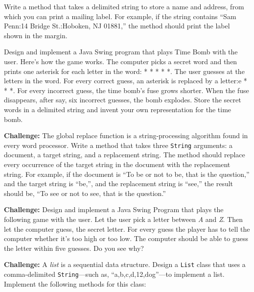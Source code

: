 \begin{EXRtwo}
\item  Write a method that takes a delimited string to
store a name and address, from which you can print a mailing label.  For example, if
the string contains ``Sam Penn:14 Bridge St.:Hoboken, NJ 01881,''
the method should print the label shown in the margin.

\item  Design and implement a Java Swing program that plays Time Bomb with the user.
Here's how the game works.  The computer picks a secret word and then
prints one asterisk for each letter in the word: * * * * *.  The user
guesses at the letters in the word.   For every correct guess, an
asterisk is replaced by a letter:\break * e * * *.  For every incorrect
guess, the time bomb's fuse grows shorter.  When the fuse disappears,
after say, six incorrect guesses, the bomb explodes.  Store the secret
words in a delimited string and invent your own representation for
the time bomb.

\item {\bf Challenge: } The global replace function is a
string-processing algorithm found in every word processor.  Write a
method that takes three {\tt String} arguments: a document, a target
string, and a replacement string.  The method should replace every
occurrence of the target string in the document with the replacement
string.  For example, if the document is ``To be or not to be, that is
the question,'' and the target string is ``be,'', and the replacement
string is ``see,'' the result should be, ``To see or not to see, that
is the question.''

\item  {\bf Challenge: } Design and implement a Java Swing Program that plays
the following game with the user.  Let the user pick a letter between
{\it A} and {\it Z}. Then let the computer guess, the secret letter.  For
every guess the player has to tell the computer whether it's too
high or too low.  The computer should be able to guess the letter
within five guesses.  Do you see why?

\item  {\bf Challenge:} A {\it list} is a sequential
data structure.  Design a {\tt List} class that uses a comma-delimited
{\tt String}---such as, ``a,b,c,d,12,dog''---to implement a list.
Implement the following methods for this class:


\end{EXRtwo}

